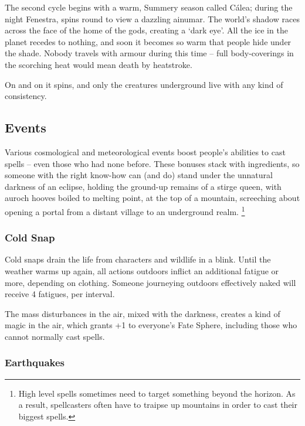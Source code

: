 \begin{multicols}{2}
The second cycle begins with a warm, Summery season called C\'{a}lea; during the night Fenestra, spins round to view a dazzling \gls{ainumar}.
The world's shadow races across the face of the home of the gods, creating a `dark eye'.
All the ice in the planet recedes to nothing, and soon it becomes so warm that people hide under the shade.
Nobody travels with armour during this time -- full body-coverings in the scorching heat would mean death by heatstroke.

On and on it spins, and only the creatures underground live with any kind of consistency.

\subsection{Events}
Various cosmological and meteorological events boost people's abilities to cast spells -- even those who had none before.
These bonuses stack with \glspl{ingredient}, so someone with the right know-how can (and do) stand under the unnatural darkness of an eclipse, holding the ground-up remains of a stirge queen, with auroch hooves boiled to melting point, at the top of a mountain, screeching about opening a portal from a distant \gls{village} to an underground realm.%
\footnote{High level spells sometimes need to target something beyond the horizon.
As a result, spellcasters often have to traipse up mountains in order to cast their biggest spells.}

\subsubsection{Cold Snap}

Cold snaps drain the life from characters and wildlife in a blink.
Until the weather warms up again, all actions outdoors inflict an additional \gls{fatigue} or more, depending on clothing.
Someone journeying outdoors effectively naked will receive 4 \glspl{fatigue}, per \gls{interval}.

The mass disturbances in the air, mixed with the darkness, creates a kind of magic in the air, which grants +1 to everyone's Fate Sphere, including those who cannot normally cast spells.

\subsubsection{Earthquakes}


\end{multicols}

